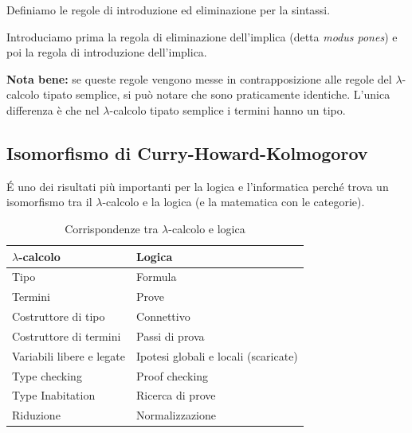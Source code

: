 \documentclass{article}
\begin{document}
\bigskip

Definiamo le regole di introduzione ed eliminazione per la sintassi.

\bigskip


\bigskip

Introduciamo prima la regola di eliminazione dell'implica (detta \textit{modus pones}) e poi la regola di introduzione dell'implica.

\bigskip


\bigskip


\bigskip

\textbf{Nota bene:} se queste regole vengono messe in contrapposizione alle regole del $\lambda$-calcolo tipato semplice, si può notare che sono praticamente identiche. L'unica differenza è che nel $\lambda$-calcolo tipato semplice i termini hanno un tipo.

\subsection{Isomorfismo di Curry-Howard-Kolmogorov}
\'E uno dei risultati più importanti per la logica e l'informatica perché trova un isomorfismo tra il $\lambda$-calcolo e la logica (e la matematica con le categorie).

\begin{table}[!ht]
    \centering
    \begin{tabularx}{\textwidth}{|X|X|}
        \hline
        \textbf{$\lambda$-calcolo} & \textbf{Logica}  \\ \hline
        Tipo & Formula \\ \hline
        Termini & Prove \\ \hline
        Costruttore di tipo & Connettivo \\ \hline
        Costruttore di termini & Passi di prova \\ \hline
        Variabili libere e legate & Ipotesi globali e locali (scaricate) \\ \hline
        Type checking & Proof checking \\ \hline
        Type Inabitation & Ricerca di prove \\ \hline
        Riduzione & Normalizzazione \\ \hline
    \end{tabularx}
    \caption{Corrispondenze tra $\lambda$-calcolo e logica}
    \label{tab:isochk}
\end{table}
\end{document}
